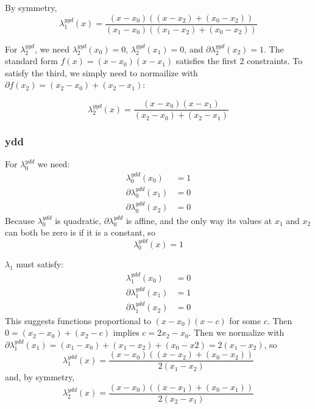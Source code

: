 By symmetry, 
\begin{equation}
\lambda^{yyd}_1(x) = 
\frac 
{(x - x_0) \left( (x - x_2) + (x_0 - x_2) \right)} 
{(x_1 - x_0) \left( (x_1 - x_2) + (x_0 - x_2) \right)}
\end{equation}

 For $\lambda^{yyd}_2$, we need 
$\lambda^{yyd}_2(x_0) = 0$, 
$\lambda^{yyd}_2(x_1) = 0$, and
$\partial\lambda^{yyd}_2(x_2) = 1$. 
The standard form $f(x) = (x-x_0) (x-x_1)$ satisfies the first 
$2$ constraints. 
To satisfy the third, we simply need to normailize with
$\partial{f}(x_2) = (x_2 - x_0) + (x_2 - x_1)$:

\begin{equation}
\lambda^{yyd}_2(x) = 
\frac 
{(x - x_0) (x - x_1)} 
{(x_2 - x_0) + (x_2 - x_1)}
\end{equation}

\subsubsection{ydd}

For $\lambda^{ydd}_0$ we need:
\begin{align}
\lambda^{ydd}_0(x_0) & = 1 \\
\partial\lambda^{ydd}_0(x_1) & = 0 \nonumber \\
\partial\lambda^{ydd}_0(x_2) & = 0 \nonumber
\end{align}
Because $\lambda^{ydd}_0$ is quadratic,
$\partial\lambda^{ydd}_0$ is affine, 
and the only way its values
at $x_1$ and $x_2$ can both be zero is if it is a constant, so 
\begin{equation}
\lambda^{ydd}_0(x) = 1
\end{equation}

$\lambda_1$ must satisfy:
\begin{align}
\lambda^{ydd}_1(x_0) & = 0 \\
\partial\lambda^{ydd}_1(x_1) & = 1 \nonumber \\
\partial\lambda^{ydd}_1(x_2) & = 0 \nonumber
\end{align}
This suggests functions proportional to $(x - x_0) (x - c)$ 
for some $c$. Then 
$ 0 = (x_2 - x_0) + (x_2 - c)$
implies $ c = 2 x_2 - x_0$.
Then we normalize with 
$\partial\lambda^{ydd}_1(x_1) = (x_1 - x_0) + (x_1 - x_2) + (x_0 - x2) 
= 2 (x_1 - x_2)$, so 
\begin{equation}
\lambda^{ydd}_1(x) = 
\frac {(x - x_0) \left((x - x_2) + (x_0 - x_2)\right)} 
{2 (x_1 - x_2)}
\end{equation}
and, by symmetry,
\begin{equation}
\lambda^{ydd}_2(x) = 
\frac {(x - x_0) \left( (x -x_1) + (x_0 - x_1) \right)} 
{2 (x_2 - x_1)}
\end{equation}

